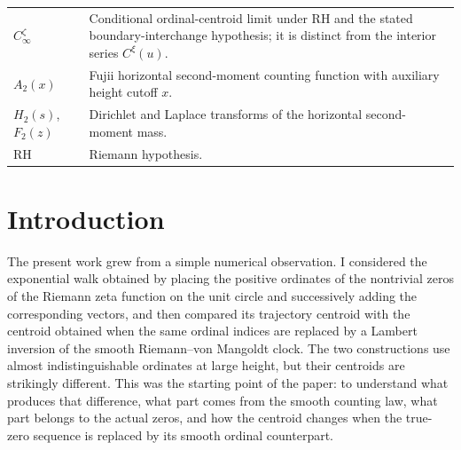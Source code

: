 \documentclass[11pt]{amsart}
\numberwithin{equation}{section}
\theoremstyle{definition}
\theoremstyle{remark}
\newcommand{\RH}{\mathrm{RH}}
\begin{document}
\begin{longtable}{@{}p{}p{}@{}}
$C_\infty^{\zeta}$ & Conditional ordinal-centroid limit under RH and the stated boundary-interchange hypothesis; it is distinct from the interior series $C^{\xi}(u)$. \\
$A_2(x)$ & Fujii horizontal second-moment counting function with auxiliary height cutoff $x$. \\
$H_2(s)$, $F_2(z)$ & Dirichlet and Laplace transforms of the horizontal second-moment mass. \\
$\RH$ & Riemann hypothesis. \\
\bottomrule
\end{longtable}

\section{Introduction}\label{sec:introduction}

The present work grew from a simple numerical observation. I considered the exponential walk obtained by placing the positive ordinates of the nontrivial zeros of the Riemann zeta function on the unit circle and successively adding the corresponding vectors, and then compared its trajectory centroid with the centroid obtained when the same ordinal indices are replaced by a Lambert inversion of the smooth Riemann--von Mangoldt clock. The two constructions use almost indistinguishable ordinates at large height, but their centroids are strikingly different. This was the starting point of the paper: to understand what produces that difference, what part comes from the smooth counting law, what part belongs to the actual zeros, and how the centroid changes when the true-zero sequence is replaced by its smooth ordinal counterpart.
\end{document}
